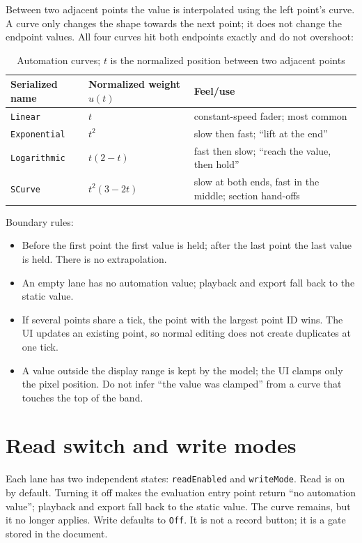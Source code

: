 Between two adjacent points the value is interpolated using the left point's curve. A curve only changes the shape towards the next point; it does not change the endpoint values. All four curves hit both endpoints exactly and do not overshoot:

\begin{table}[htbp]
\centering
\small
\begin{tabular}{@{}lll@{}}
\hline
Serialized name & Normalized weight $u(t)$ & Feel/use \\
\hline
\texttt{Linear} & $t$ & constant-speed fader; most common \\
\texttt{Exponential} & $t^2$ & slow then fast; ``lift at the end'' \\
\texttt{Logarithmic} & $t(2-t)$ & fast then slow; ``reach the value, then hold'' \\
\texttt{SCurve} & $t^2(3-2t)$ & slow at both ends, fast in the middle; section hand-offs \\
\hline
\end{tabular}
\caption{Automation curves; $t$ is the normalized position between two adjacent points}
\label{tab:automation-curves}
\end{table}

Boundary rules:

\begin{itemize}
  \item Before the first point the first value is held; after the last point the last value is held. There is no extrapolation.
  \item An empty lane has no automation value; playback and export fall back to the static value.
  \item If several points share a tick, the point with the largest point ID wins. The UI updates an existing point, so normal editing does not create duplicates at one tick.
  \item A value outside the display range is kept by the model; the UI clamps only the pixel position. Do not infer ``the value was clamped'' from a curve that touches the top of the band.
\end{itemize}

\section{Read switch and write modes}

Each lane has two independent states: \texttt{readEnabled} and \texttt{writeMode}. Read is on by default. Turning it off makes the evaluation entry point return ``no automation value''; playback and export fall back to the static value. The curve remains, but it no longer applies. Write defaults to \texttt{Off}. It is not a record button; it is a gate stored in the document.

